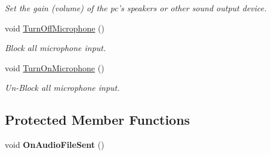 \begin{CompactItemize}
\begin{CompactList}\small\item\em Set the gain (volume) of the pc's speakers or other sound output device. \item\end{CompactList}\item 
\hypertarget{classTelephonyIfc_4b81a2cfb03620cd829e8da73dfe0ea4}{
void \hyperlink{classTelephonyIfc_4b81a2cfb03620cd829e8da73dfe0ea4}{TurnOffMicrophone} ()}
\label{classTelephonyIfc_4b81a2cfb03620cd829e8da73dfe0ea4}

\begin{CompactList}\small\item\em Block all microphone input. \item\end{CompactList}\item 
\hypertarget{classTelephonyIfc_d5ecca9d510408b2ce43cb5b5071b357}{
void \hyperlink{classTelephonyIfc_d5ecca9d510408b2ce43cb5b5071b357}{TurnOnMicrophone} ()}
\label{classTelephonyIfc_d5ecca9d510408b2ce43cb5b5071b357}

\begin{CompactList}\small\item\em Un-Block all microphone input. \item\end{CompactList}\end{CompactItemize}
\subsection*{Protected Member Functions}
\begin{CompactItemize}
\item 
\hypertarget{classTelephonyIfc_95f4177c87b299ab8dd0a2a13a319e0e}{
void \textbf{OnAudioFileSent} ()}
\label{classTelephonyIfc_95f4177c87b299ab8dd0a2a13a319e0e}

\end{CompactItemize}
